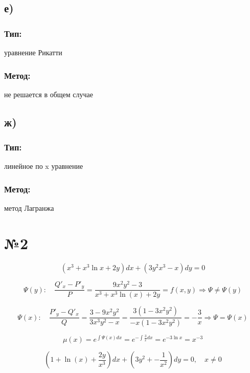 \documentclass{article}
\begin{document}
\subsection*{е)}
\subsubsection*{Тип:} 
уравнение Рикатти

\subsubsection*{Метод:}
не решается в общем случае

\subsection*{ж)}
\subsubsection*{Тип:} 
линейное по x уравнение 

\subsubsection*{Метод:}
метод Лагранжа

\section*{№2}

\begin{equation*}
    (x^3+x^3\ln{x}+2y)dx+(3y^2x^3-x)dy=0
\end{equation*}

\begin{equation*}
    \Psi(y): \quad \frac{Q'_x-P'_y}{P}=
    \frac{9x^2y^2-3}{x^3+x^3\ln(x)+2y}=f(x,y) \Rightarrow \Psi\neq\Psi(y)
\end{equation*}

\begin{equation*}
    \Psi(x): \quad \frac{P'_y-Q'_x}{Q}=
    \frac{3-9x^2y^2}{3x^3y^2-x}=
    \frac{3(1-3x^2y^2)}{-x(1-3x^2y^2)}=-\frac{3}{x}
    \Rightarrow \Psi=\Psi(x)
\end{equation*}

\begin{equation*}
    \mu(x)=e^{\int\Psi(x)dx}=e^{-\int\frac{3}{x}dx}=e^{-3\ln x}=x^{-3}
\end{equation*}

\begin{equation}
    \left(1+\ln(x)+\frac{2y}{x^3}\right)dx+\left(3y^2+-\frac{1}{x^2}\right)dy=0 \label{pdd},\quad x\neq0
\end{equation}
\end{document}
